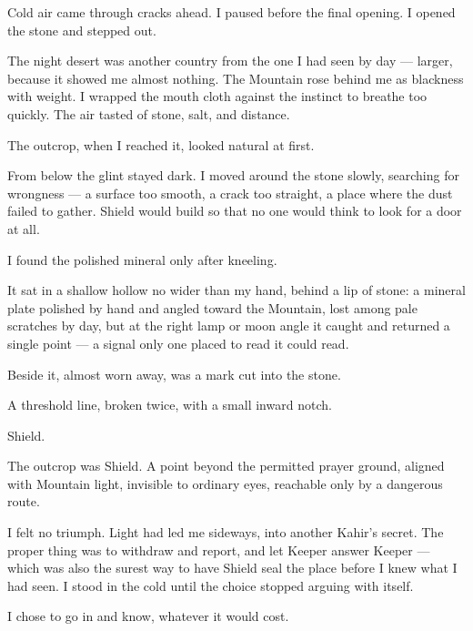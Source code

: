 Cold air came through cracks ahead. I paused before the final opening. I opened the stone and stepped out.\par

The night desert was another country from the one I had seen by day --- larger, because it showed me almost nothing. The Mountain rose behind me as blackness with weight. I wrapped the mouth cloth against the instinct to breathe too quickly. The air tasted of stone, salt, and distance.

The outcrop, when I reached it, looked natural at first.\par

From below the glint stayed dark. I moved around the stone slowly, searching for wrongness --- a surface too smooth, a crack too straight, a place where the dust failed to gather. Shield would build so that no one would think to look for a door at all.\par

I found the polished mineral only after kneeling.\par

It sat in a shallow hollow no wider than my hand, behind a lip of stone: a mineral plate polished by hand and angled toward the Mountain, lost among pale scratches by day, but at the right lamp or moon angle it caught and returned a single point --- a signal only one placed to read it could read.\par

Beside it, almost worn away, was a mark cut into the stone.\par

A threshold line, broken twice, with a small inward notch.\par

Shield.\par

The outcrop was Shield. A point beyond the permitted prayer ground, aligned with Mountain light, invisible to ordinary eyes, reachable only by a dangerous route.\par

I felt no triumph. Light had led me sideways, into another Kahir's secret. The proper thing was to withdraw and report, and let Keeper answer Keeper --- which was also the surest way to have Shield seal the place before I knew what I had seen. I stood in the cold until the choice stopped arguing with itself.\par

I chose to go in and know, whatever it would cost.\par

